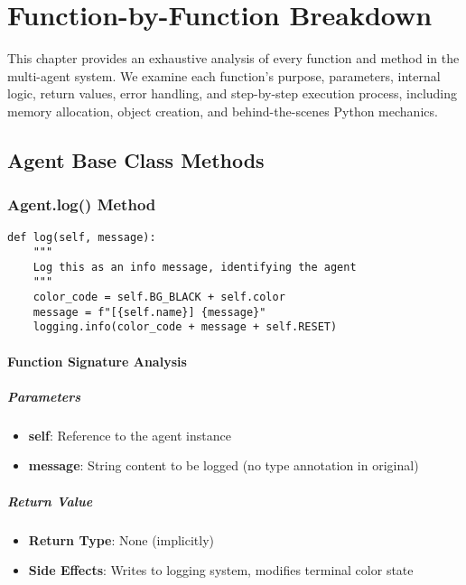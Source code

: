 \chapter{Function-by-Function Breakdown}

This chapter provides an exhaustive analysis of every function and method in the multi-agent system. We examine each function's purpose, parameters, internal logic, return values, error handling, and step-by-step execution process, including memory allocation, object creation, and behind-the-scenes Python mechanics.

\section{Agent Base Class Methods}

\subsection{Agent.log() Method}

\begin{lstlisting}[caption=Agent.log() Method Deep Analysis]
def log(self, message):
    """
    Log this as an info message, identifying the agent
    """
    color_code = self.BG_BLACK + self.color
    message = f"[{self.name}] {message}"
    logging.info(color_code + message + self.RESET)
\end{lstlisting}

\subsubsection{Function Signature Analysis}

\paragraph{Parameters}
\begin{itemize}
\item \textbf{self}: Reference to the agent instance
\item \textbf{message}: String content to be logged (no type annotation in original)
\end{itemize}

\paragraph{Return Value}
\begin{itemize}
\item \textbf{Return Type}: None (implicitly)
\item \textbf{Side Effects}: Writes to logging system, modifies terminal color state
\end{itemize}

